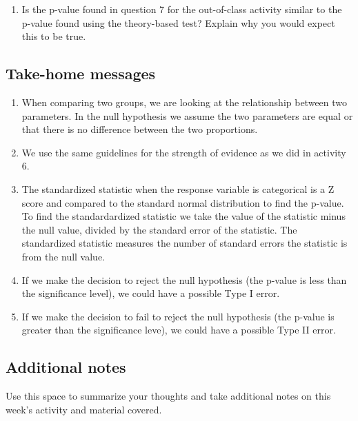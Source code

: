 \documentclass[
]{report}
\providecommand{\tightlist}{%
  \setlength{\itemsep}{0pt}\setlength{\parskip}{0pt}}
\begin{document}
\begin{enumerate}
\def\labelenumi{\arabic{enumi}.}
\setcounter{enumi}{7}
\tightlist
\item
  Is the p-value found in question 7 for the out-of-class activity similar to the p-value found using the theory-based test? Explain why you would expect this to be true.
\end{enumerate}

\vspace{1in}

\hypertarget{take-home-messages-7}{%
\subsection{Take-home messages}\label{take-home-messages-7}}

\begin{enumerate}
\def\labelenumi{\arabic{enumi}.}
\item
  When comparing two groups, we are looking at the relationship between two parameters. In the null hypothesis we assume the two parameters are equal or that there is no difference between the two proportions.
\item
  We use the same guidelines for the strength of evidence as we did in activity 6.
\item
  The standardized statistic when the response variable is categorical is a Z score and compared to the standard normal distribution to find the p-value. To find the standardardized statistic we take the value of the statistic minus the null value, divided by the standard error of the statistic. The standardized statistic measures the number of standard errors the statistic is from the null value.
\item
  If we make the decision to reject the null hypothesis (the p-value is less than the significance level), we could have a possible Type I error.
\item
  If we make the decision to fail to reject the null hypothesis (the p-value is greater than the significance leve), we could have a possible Type II error.
\end{enumerate}

\hypertarget{additional-notes-7}{%
\subsection{Additional notes}\label{additional-notes-7}}

Use this space to summarize your thoughts and take additional notes on this week's activity and material covered.
\end{document}
